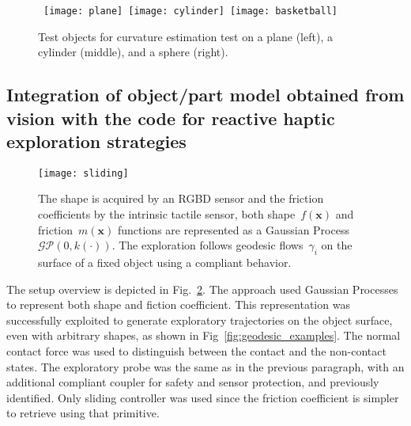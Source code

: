 \begin{figure}[!h]
    \centering
    \label{fig:curvature}
    \mbox{
    \texttt{[image: plane]}
    \texttt{[image: cylinder]}
    \texttt{[image: basketball]}
    }
    \caption{Test objects for curvature estimation test on a plane (left), a cylinder (middle), and a sphere (right).}
    \vspace{9pt}
\end{figure}



\subsection{Integration of object/part model obtained from vision with the code for reactive haptic exploration strategies}

\begin{figure}[!b]
  \begin{center}
    \texttt{[image: sliding]}
  \end{center}
  \caption{The shape is acquired by an RGBD sensor and the friction coefficients by the intrinsic tactile sensor, both shape~$f(\mathbf{x})$ and friction~$m(\mathbf{x})$ functions are represented as a Gaussian Process $\mathcal{GP}(0,k(\cdot))$. The exploration follows geodesic flows~$\gamma_i$ on the surface of a fixed object using a compliant behavior.}
  \label{fig:schema}
\end{figure}

The setup overview is depicted in Fig.~\ref{fig:schema}. The approach used Gaussian Processes to represent both shape and fiction coefficient. This representation was successfully exploited to generate exploratory trajectories on the object surface, even with arbitrary shapes, as shown in Fig~\ref{fig:geodesic_examples}. The normal contact force was used to distinguish between the contact and the non-contact states. The exploratory probe was the same as in the previous paragraph, with an additional compliant coupler for safety and sensor protection, and previously identified. Only sliding controller was used since the friction coefficient is simpler to retrieve using that primitive. 


